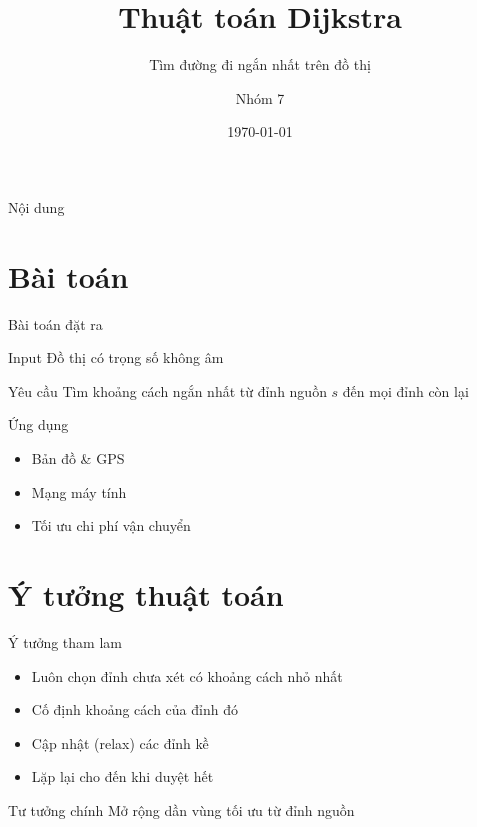 \documentclass[aspectratio=169]{beamer}
\title{Thuật toán Dijkstra}
\subtitle{Tìm đường đi ngắn nhất trên đồ thị}
\author{Nhóm 7}
\date{\today}
\begin{document}
\begin{frame}
\titlepage
\end{frame}

\begin{frame}{Nội dung}
\tableofcontents
\end{frame}

\section{Bài toán}

\begin{frame}{Bài toán đặt ra}

\begin{block}{Input}
Đồ thị có trọng số không âm
\end{block}

\begin{block}{Yêu cầu}
Tìm khoảng cách ngắn nhất từ đỉnh nguồn $s$ đến mọi đỉnh còn lại
\end{block}

\begin{block}{Ứng dụng}
\begin{itemize}
\item Bản đồ \& GPS
\item Mạng máy tính
\item Tối ưu chi phí vận chuyển
\end{itemize}
\end{block}

\end{frame}

\section{Ý tưởng thuật toán}

\begin{frame}{Ý tưởng tham lam}

\begin{itemize}
\item Luôn chọn đỉnh chưa xét có khoảng cách nhỏ nhất
\item Cố định khoảng cách của đỉnh đó
\item Cập nhật (relax) các đỉnh kề
\item Lặp lại cho đến khi duyệt hết
\end{itemize}

\begin{block}{Tư tưởng chính}
Mở rộng dần vùng tối ưu từ đỉnh nguồn
\end{block}

\end{frame}
\end{document}
